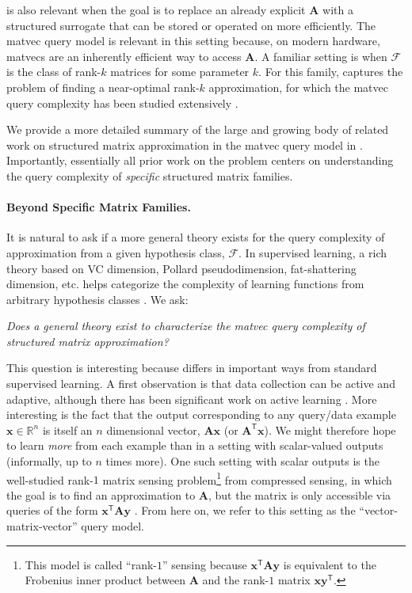 \documentclass{article}[11pt]
\theoremstyle{definition}
\newcommand{\bv}[1]{\boldsymbol{\mathbf{#1}}}
\newcommand{\R}{\mathbb{R}}
\newcommand{\transpose}{\mathsf{T}}
\newcommand{\family}{\mathcal{F}}
\begin{document}
 is also relevant when the goal is to replace an already explicit $\bv{A}$ with a structured surrogate that can be stored or operated on more efficiently. 
The matvec query model is relevant in this setting because, on modern hardware, matvecs are an inherently efficient way to access $\bv{A}$. 
A familiar setting is when $\family$ is the class of rank-$k$ matrices for some parameter $k$. For this family,  captures the problem of finding a near-optimal rank-$k$ approximation, for which the matvec query complexity has been studied extensively \cite{MuscoMusco:2015,BakshiClarksonWoodruff:2022,BakshiNarayanan:2023,MeyerMuscoMusco:2024}.

We provide a more detailed summary of the large and growing body of related work on structured matrix approximation in the matvec query model in . Importantly, essentially all prior work on the problem centers on understanding the query complexity of \emph{specific} structured matrix families. 

\paragraph{Beyond Specific Matrix Families.}
It is natural to ask if a more general theory exists for the query complexity of approximation from a given hypothesis class, $\mathcal{F}$. In supervised learning, a rich theory based on VC dimension, Pollard pseudodimension, fat-shattering dimension, etc. helps categorize the complexity of learning functions from arbitrary hypothesis classes \cite{Pollard:1990,AlonBen-DavidCesa-Bianchi:1997,AnthonyBartlett:1999,Vapnik:2000}. We ask:

\begin{center}\textit{Does a general theory exist to characterize the matvec query complexity of structured matrix approximation?} \end{center}

This question is interesting because  differs in important ways from standard supervised learning. A first observation is that data collection can be active and adaptive, although there has been significant work on active learning \cite{Settles:2009}. More interesting is the fact that the output corresponding to any query/data example $\bv{x}\in \R^n$ is itself an $n$ dimensional vector, $\bv{A}\bv{x}$ (or $\bv{A}^\transpose\bv{x}$). We might therefore hope to learn \emph{more}  from each example than in a setting with scalar-valued outputs (informally, up to $n$ times more). One such setting with scalar outputs is the well-studied rank-$1$ matrix sensing problem\footnote{This model is called ``rank-$1$'' sensing because $\bv{x}^\transpose\bv{A}\bv{y}$ is equivalent to the Frobenius inner product between $\bv{A}$ and the rank-$1$ matrix $\bv{x}\bv{y}^\transpose$.} from compressed sensing, in which the goal is to find an approximation to $\bv{A}$, but the matrix is only accessible via queries of the form $\bv{x}^\transpose\bv{A}\bv{y}$ \cite{ZhongJainDhillon:2015,DasarathyShahBhaskar:2015,KuengRauhutTerstiege:2017}. From here on, we refer to this setting as the ``vector-matrix-vector'' query model.
\end{document}
